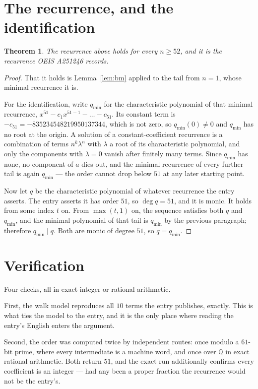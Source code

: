 \documentclass[11pt,a4paper]{article}
\theoremstyle{plain}
\newtheorem{theorem}{Theorem}
\theoremstyle{definition}
\begin{document}
\section{The recurrence, and the identification}

\begin{theorem}
The recurrence above holds for every $n\ge52$, and it is the recurrence OEIS A251246 records.
\end{theorem}

\begin{proof}
That it holds is Lemma~\ref{lem:bm} applied to the tail from $n=1$, whose minimal
recurrence it is.

For the identification, write $q_{\min}$ for the characteristic polynomial of that minimal
recurrence, $x^{51}-c_1x^{51-1}-\dots-c_{51}$. Its constant term is
$-c_{51}=-835234548219950137344$, which is not zero, so $q_{\min}(0)\neq0$ and $q_{\min}$ has no
root at the origin. A solution of a constant-coefficient recurrence is a combination of terms
$n^{k}\lambda^{n}$ with $\lambda$ a root of its characteristic polynomial, and only the
components with $\lambda=0$ vanish after finitely many terms. Since $q_{\min}$ has none, no
component of $a$ dies out, and the minimal recurrence of every further tail is again
$q_{\min}$ --- the order cannot drop below $51$ at any later starting point.

Now let $q$ be the characteristic polynomial of whatever recurrence the entry asserts. The
entry asserts it has order $51$, so $\deg q=51$, and it is monic. It holds from some
index $t$ on. From $\max(t,1)$ on, the sequence satisfies both $q$ and $q_{\min}$, and
the minimal polynomial of that tail is $q_{\min}$ by the previous paragraph; therefore
$q_{\min}\mid q$. Both are monic of degree $51$, so $q=q_{\min}$.
\end{proof}

\section{Verification}

Four checks, all in exact integer or rational arithmetic.

First, the walk model reproduces all $10$ terms the entry publishes, exactly. This is
what ties the model to the entry, and it is the only place where reading the entry's English
enters the argument.

Second, the order was computed twice by independent routes: once modulo a $61$-bit prime, where
every intermediate is a machine word, and once over $\mathbb{Q}$ in exact rational arithmetic.
Both return $51$, and the exact run additionally confirms every coefficient is an integer
--- had any been a proper fraction the recurrence would not be the entry's.
\end{document}
